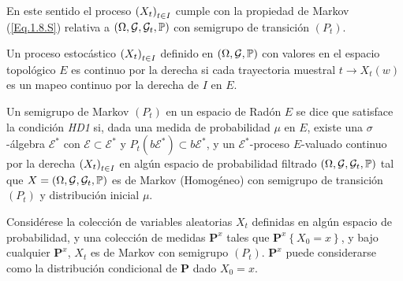 En este sentido el proceso $\left(X_{t}\right)_{t\in I}$ cumple con la propiedad de Markov
(\ref{Eq.1.8.S}) relativa a
$\left(\Omega,\mathcal{G},\mathcal{G}_{t},\mathbb{P}\right)$ con
semigrupo de transici\'on $\left(P_{t}\right)$.

\begin{Def}
Un proceso estoc\'astico $\left(X_{t}\right)_{t\in I}$ definido en
$\left(\Omega,\mathcal{G},\mathbb{P}\right)$ con valores en el espacio
topol\'ogico $E$ es continuo por la derecha si cada trayectoria
muestral $t\rightarrow X_{t}\left(w\right)$ es un mapeo continuo
por la derecha de $I$ en $E$.
\end{Def}

\begin{Def}[HD1]\label{Eq.2.1.S}
Un semigrupo de Markov $\left(P_{t}\right)$ en un espacio de
Rad\'on $E$ se dice que satisface la condici\'on {\em HD1} si,
dada una medida de probabilidad $\mu$ en $E$, existe una
$\sigma$-\'algebra $\mathcal{E^{*}}$ con
$\mathcal{E}\subset\mathcal{E}^{*}$ y
$P_{t}\left(b\mathcal{E}^{*}\right)\subset b\mathcal{E}^{*}$, y un
$\mathcal{E}^{*}$-proceso $E$-valuado continuo por la derecha
$\left(X_{t}\right)_{t\in I}$ en alg\'un espacio de probabilidad filtrado
$\left(\Omega,\mathcal{G},\mathcal{G}_{t},\mathbb{P}\right)$ tal que
$X=\left(\Omega,\mathcal{G},\mathcal{G}_{t},\mathbb{P}\right)$ es de
Markov (Homog\'eneo) con semigrupo de transici\'on $(P_{t})$ y
distribuci\'on inicial $\mu$.
\end{Def}

Consid\'erese la colecci\'on de variables aleatorias $X_{t}$
definidas en alg\'un espacio de probabilidad, y una colecci\'on de
medidas $\mathbf{P}^{x}$ tales que
$\mathbf{P}^{x}\left\{X_{0}=x\right\}$, y bajo cualquier
$\mathbf{P}^{x}$, $X_{t}$ es de Markov con semigrupo
$\left(P_{t}\right)$. $\mathbf{P}^{x}$ puede considerarse como la
distribuci\'on condicional de $\mathbf{P}$ dado $X_{0}=x$.

